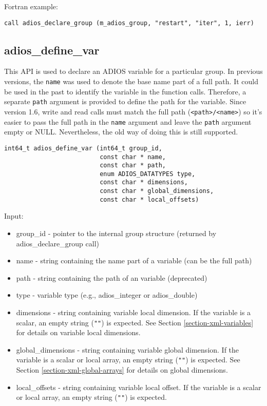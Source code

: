 Fortran example: 
\begin{lstlisting}[alsolanguage=Fortran,caption={},label={}]
call adios_declare_group (m_adios_group, "restart", "iter", 1, ierr)
\end{lstlisting}

\subsection{adios\_define\_var}

This API is used to declare an ADIOS variable for a particular group. In previous versions, the \verb+name+ was used to denote the base name part of a full path. It could be used in the past to identify the variable in the function calls. Therefore, a separate \verb+path+ argument is provided to define the path for the variable. Since version 1.6, write and read calls must match the full path (\verb+<path>/<name>+) so it's easier to pass the full path in the \verb+name+ argument and leave the \verb+path+ argument empty or NULL. Nevertheless, the old way of doing this is still supported.  

\begin{lstlisting}[alsolanguage=C,caption={},label={}]
int64_t adios_define_var (int64_t group_id, 
                          const char * name,
                          const char * path,
                          enum ADIOS_DATATYPES type,
                          const char * dimensions,
                          const char * global_dimensions,
                          const char * local_offsets)
\end{lstlisting}

Input: 
\begin{itemize}
\item group\_id - pointer to the internal group structure (returned by adios\_declare\_group 
call)

\item name - string containing the name part of a variable (can be the full path)

\item path - string containing the path of an variable (deprecated)

\item type - variable type (e.g., adios\_integer or adios\_double) 

\item dimensions - string containing variable local dimension. 
If the variable is a scalar, an empty string (\verb+""+) is expected. 
See Section \ref{section-xml-variables} for details on variable local dimensions.

\item global\_dimensions - string containing variable global dimension. If the variable 
is a scalar or local array, an empty string (\verb+""+) is expected. 
See Section \ref{section-xml-global-arrays} for details on global dimensions.

\item local\_offsets - string containing variable local offset. If the variable is a 
scalar or local array, an empty string (\verb+""+) is expected.
\end{itemize}

